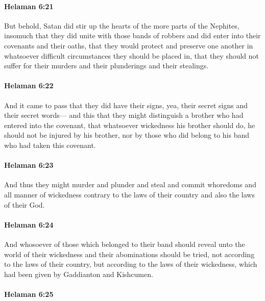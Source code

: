 		\paragraph{Helaman 6:21} %
			\label{HELAMAN-6-21}

			But behold, Satan did stir up the hearts of the more parts of the Nephites,
			insomuch that they did unite with those bands of robbers
			and did enter into their covenants and their oaths,
			that they would protect and preserve one another
			in whatsoever difficult circumstances they should be placed in,
			that they should not suffer for their murders
			and their plunderings and their stealings.

		\paragraph{Helaman 6:22} %
			\label{HELAMAN-6-22}

			And it came to pass that they did have their signs,
			yea, their secret signs and their secret words---
			and this that they might distinguish a brother
			who had entered into the covenant,
			that whatsoever wickedness his brother should do,
			he should not be injured by his brother,
			nor by those who did belong to his band who had taken this covenant.

		\paragraph{Helaman 6:23} %
			\label{HELAMAN-6-23}

			And thus they might murder and plunder and steal
			and commit whoredoms and all manner of wickedness
			contrary to the laws of their country and also the laws of their God.

		\paragraph{Helaman 6:24} %
			\label{HELAMAN-6-24}

			And whosoever of those which belonged to their band
			should reveal unto the world of their wickedness and their abominations
			should be tried, not according to the laws of their country,
			but according to the laws of their wickedness,
			which had been given by Gaddianton and Kishcumen.

		\paragraph{Helaman 6:25} %
			\label{HELAMAN-6-25}


